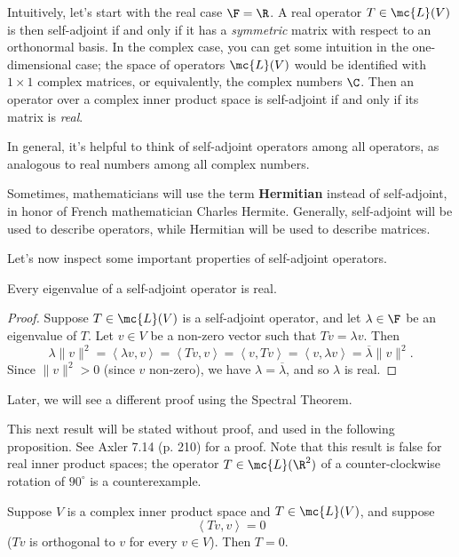 \documentclass[math0540-lecture-notes.tex]{subfiles}
\begin{document}
Intuitively, let's start with the real case $\F=\R$. A real operator $T\in \mc{L}(V)$ is then
self-adjoint if and only if it has a \textit{symmetric} matrix with respect to an orthonormal basis.
In the complex case, you can get some intuition in the one-dimensional case; the space of operators
$\mc{L}(V)$ would be identified with $1\times 1$ complex matrices, or equivalently, the complex
numbers $\C$. Then an operator over a complex inner product space is self-adjoint if and only if its
matrix is \textit{real}.

In general, it's helpful to think of self-adjoint operators among all operators, as analogous to
real numbers among all complex numbers.

\begin{remark}
  Sometimes, mathematicians will use the term \textbf{Hermitian} instead of self-adjoint, in honor
  of French mathematician Charles Hermite. Generally, self-adjoint will be used to describe
  operators, while Hermitian will be used to describe matrices.
\end{remark}

Let's now inspect some important properties of self-adjoint operators.
\begin{proposition}{}
  Every eigenvalue of a self-adjoint operator is real.
\end{proposition}
\begin{proof}[Proof]
  Suppose $T\in \mc{L}(V)$ is a self-adjoint operator, and let $\lambda\in \F$ be an eigenvalue of
  $T$. Let $v\in V$ be a non-zero vector such that $Tv=\lambda v$. Then \[
    \lambda\|v\|^2=\left<\lambda v,v \right> =\left< Tv,v\right> =\left<v,Tv \right>
    =\left<v,\lambda v \right> =\overline{\lambda}\|v\|^2
  .\] Since $\|v\|^2>0$ (since $v$ non-zero), we have $\lambda=\overline{\lambda}$, and so $\lambda$
  is real.
\end{proof}
Later, we will see a different proof using the Spectral Theorem.

This next result will be stated without proof, and used in the following proposition. See Axler 7.14
(p. 210) for a proof. Note that this result is false for real inner product spaces; the operator
$T\in \mc{L}(\R^2)$ of a counter-clockwise rotation of $90^{\circ}$ is a counterexample.
\begin{proposition}{}
  Suppose $V$ is a complex inner product space and $T\in \mc{L}(V)$, and suppose \[
    \left<Tv,v \right> =0
  \] ($Tv$ is orthogonal to $v$ for every $v\in V$). Then $T=0$.
\end{proposition}
\end{document}
